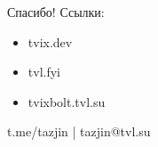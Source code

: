 \documentclass[12pt]{beamer}
\begin{document}

  \begin{frame}{Спасибо!}
    Ссылки:
    \begin{itemize}
    \item tvix.dev
    \item tvl.fyi
    \item tvixbolt.tvl.su
    \end{itemize}

    \vspace{3cm}
    \begin{center}
      t.me/tazjin | tazjin@tvl.su
    \end{center}
  \end{frame}
\end{document}
